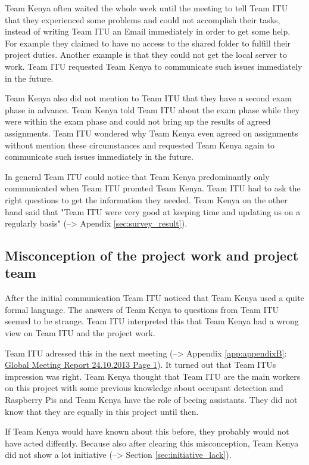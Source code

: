 Team Kenya often waited the whole week until the meeting to tell Team ITU that they experienced some problems and could not accomplish their tasks, instead of writing Team ITU an Email immediately in order to get some help. For example they claimed to have no access to the shared folder to fulfill their project duties. Another example is that they could not get the local server to work. Team ITU requested Team Kenya to communicate such issues immediately in the future.

Team Kenya also did not mention to Team ITU that they have a second exam phase in advance. Team Kenya told Team ITU about the exam phase while they were within the exam phase and could not bring up the results of agreed assignments. Team ITU wondered why Team Kenya even agreed on assignments without mention these circumstances and requested Team Kenya again to communicate such issues immediately in the future.

In general Team ITU could notice that Team Kenya predominantly only communicated when Team ITU promted Team Kenya. Team ITU had to ask the right questions to get the information they needed.
Team Kenya on the other hand said that "Team ITU were very good at keeping time and updating us on a regularly basis" (--> Apendix \ref{sec:survey_result}).


\subsection{Misconception of the project work and project team}
\label{sec:misconception}
After the initial communication Team ITU noticed that Team Kenya used a quite formal language. The answers of Team Kenya to questions from Team ITU seemed to be strange. Team ITU interpreted this that Team Kenya had a wrong view on Team ITU and the project work.

Team ITU adressed this in the next meeting (--> Appendix \ref{app:appendixB}: \hyperlink{GSD20131024.1}{Global Meeting Report 24.10.2013 Page 1}). It turned out that Team ITUs impression was right. Team Kenya thought that Team ITU are the main workers on this project with some previous knowledge about occupant detection and Raspberry Pis and Team Kenya have the role of beeing assistants. They did not know that they are equally in this project until then.

If Team Kenya would have known about this before, they probably would not have acted diffently. Because also after clearing this misconception, Team Kenya did not show a lot initiative (--> Section \ref{sec:initiative_lack}).

